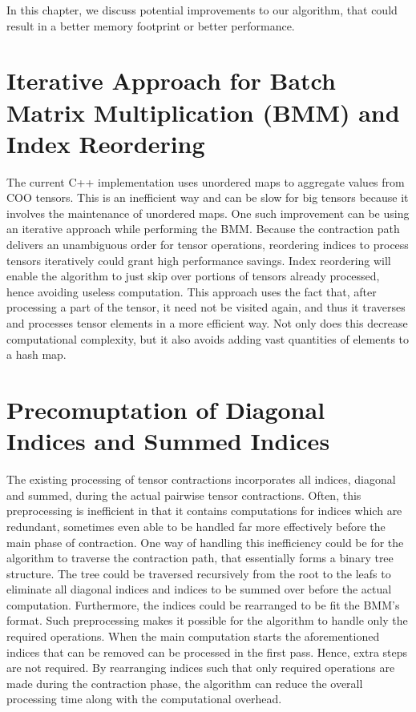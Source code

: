 In this chapter, we discuss potential improvements to our algorithm, that could result in 
a better memory footprint or better performance.

\section{Iterative Approach for Batch Matrix Multiplication (BMM) and Index Reordering}
The current C++ implementation uses unordered maps to aggregate values from COO tensors. 
This is an inefficient way and can be slow for big tensors because it involves the 
maintenance of unordered maps. One such improvement can be using an iterative approach 
while performing the BMM. Because the contraction path delivers an unambiguous order for 
tensor operations, reordering indices to process tensors iteratively could grant high 
performance savings. Index reordering will enable the algorithm to just skip over portions 
of tensors already processed, hence avoiding useless computation. This approach uses the 
fact that, after processing a part of the tensor, it need not be visited again, and thus 
it traverses and processes tensor elements in a more efficient way. Not only does this 
decrease computational complexity, but it also avoids adding vast quantities of elements 
to a hash map.

\section{Precomuptation of Diagonal Indices and Summed Indices}
The existing processing of tensor contractions incorporates all indices, diagonal and summed, 
during the actual pairwise tensor contractions. Often, this preprocessing is inefficient in 
that it contains computations for indices which are redundant, sometimes even able to be 
handled far more effectively before the main phase of contraction. One way of handling this 
inefficiency could be for the algorithm to traverse the contraction path, that essentially 
forms a binary tree structure. The tree could be traversed recursively from the root to the 
leafs to eliminate all diagonal indices and indices to be summed over before the actual 
computation. Furthermore, the indices could be rearranged to be fit the BMM's format. 
Such preprocessing makes it possible for the algorithm to handle only the required operations. 
When the main computation starts the aforementioned indices that can be removed can be 
processed in the first pass. Hence, extra steps are not required. By rearranging indices 
such that only required operations are made during the contraction phase, the algorithm can 
reduce the overall processing time along with the computational overhead.

